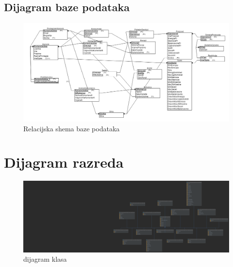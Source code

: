 \subsection{Dijagram baze podataka}
			\begin{figure}[H]
					\centering
					\includegraphics[scale=0.4]{slike/REL-model-baze.png}
					\caption{Relacijska shema baze podataka}
					\label{fig:REL-model-baze}
				\end{figure} 
			\eject
			
			
		\section{Dijagram razreda}
			\begin{figure}[H]
				\centering
				\includegraphics[scale=0.05]{dijagrami/dijagram-klasa.png}
				\caption{dijagram klasa}
				\label{fig:klase}
			\end{figure}
			

